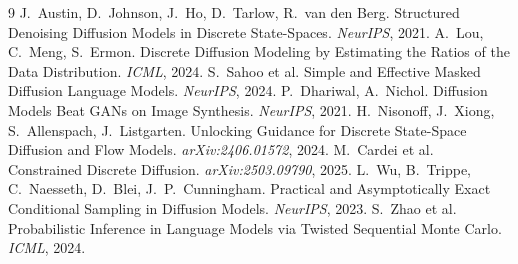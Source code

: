 \documentclass{article}
\begin{document}
\begin{thebibliography}{9}
J.~Austin, D.~Johnson, J.~Ho, D.~Tarlow, R.~van den Berg.
\newblock Structured Denoising Diffusion Models in Discrete State-Spaces.
\newblock \emph{NeurIPS}, 2021.
A.~Lou, C.~Meng, S.~Ermon.
\newblock Discrete Diffusion Modeling by Estimating the Ratios of the Data Distribution.
\newblock \emph{ICML}, 2024.
S.~Sahoo et al.
\newblock Simple and Effective Masked Diffusion Language Models.
\newblock \emph{NeurIPS}, 2024.
P.~Dhariwal, A.~Nichol.
\newblock Diffusion Models Beat GANs on Image Synthesis.
\newblock \emph{NeurIPS}, 2021.
H.~Nisonoff, J.~Xiong, S.~Allenspach, J.~Listgarten.
\newblock Unlocking Guidance for Discrete State-Space Diffusion and Flow Models.
\newblock \emph{arXiv:2406.01572}, 2024.
M.~Cardei et al.
\newblock Constrained Discrete Diffusion.
\newblock \emph{arXiv:2503.09790}, 2025.
L.~Wu, B.~Trippe, C.~Naesseth, D.~Blei, J.~P.~Cunningham.
\newblock Practical and Asymptotically Exact Conditional Sampling in Diffusion Models.
\newblock \emph{NeurIPS}, 2023.
S.~Zhao et al.
\newblock Probabilistic Inference in Language Models via Twisted Sequential Monte Carlo.
\newblock \emph{ICML}, 2024.
\end{thebibliography}
\end{document}
